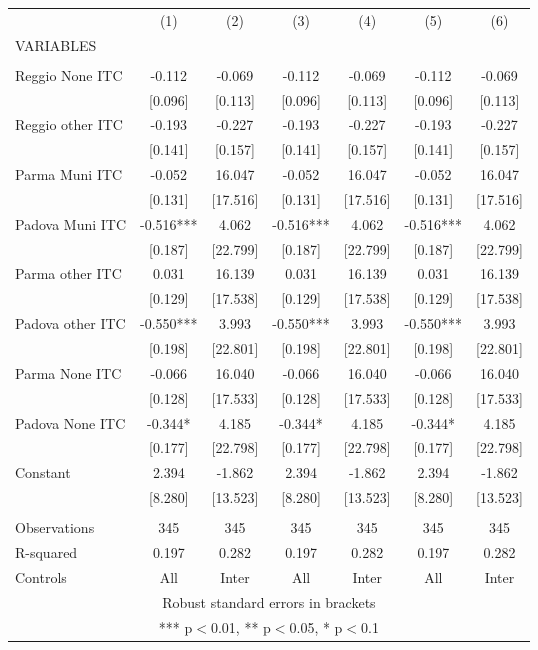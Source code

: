 \begin{tabular}{lcccccc} \hline
 & (1) & (2) & (3) & (4) & (5) & (6) \\
VARIABLES &  &  &  &  &  &  \\ \hline
 &  &  &  &  &  &  \\
Reggio None ITC & -0.112 & -0.069 & -0.112 & -0.069 & -0.112 & -0.069 \\
 & [0.096] & [0.113] & [0.096] & [0.113] & [0.096] & [0.113] \\
Reggio other ITC & -0.193 & -0.227 & -0.193 & -0.227 & -0.193 & -0.227 \\
 & [0.141] & [0.157] & [0.141] & [0.157] & [0.141] & [0.157] \\
Parma Muni ITC & -0.052 & 16.047 & -0.052 & 16.047 & -0.052 & 16.047 \\
 & [0.131] & [17.516] & [0.131] & [17.516] & [0.131] & [17.516] \\
Padova Muni ITC & -0.516*** & 4.062 & -0.516*** & 4.062 & -0.516*** & 4.062 \\
 & [0.187] & [22.799] & [0.187] & [22.799] & [0.187] & [22.799] \\
Parma other ITC & 0.031 & 16.139 & 0.031 & 16.139 & 0.031 & 16.139 \\
 & [0.129] & [17.538] & [0.129] & [17.538] & [0.129] & [17.538] \\
Padova other ITC & -0.550*** & 3.993 & -0.550*** & 3.993 & -0.550*** & 3.993 \\
 & [0.198] & [22.801] & [0.198] & [22.801] & [0.198] & [22.801] \\
Parma None ITC & -0.066 & 16.040 & -0.066 & 16.040 & -0.066 & 16.040 \\
 & [0.128] & [17.533] & [0.128] & [17.533] & [0.128] & [17.533] \\
Padova None ITC & -0.344* & 4.185 & -0.344* & 4.185 & -0.344* & 4.185 \\
 & [0.177] & [22.798] & [0.177] & [22.798] & [0.177] & [22.798] \\
Constant & 2.394 & -1.862 & 2.394 & -1.862 & 2.394 & -1.862 \\
 & [8.280] & [13.523] & [8.280] & [13.523] & [8.280] & [13.523] \\
 &  &  &  &  &  &  \\
Observations & 345 & 345 & 345 & 345 & 345 & 345 \\
R-squared & 0.197 & 0.282 & 0.197 & 0.282 & 0.197 & 0.282 \\
 Controls & All & Inter & All & Inter & All & Inter \\ \hline
\multicolumn{7}{c}{ Robust standard errors in brackets} \\
\multicolumn{7}{c}{ *** p$<$0.01, ** p$<$0.05, * p$<$0.1} \\
\end{tabular}
